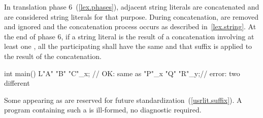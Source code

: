 \exitexample

\pnum
In translation phase 6~(\ref{lex.phases}), adjacent string literals are concatenated and
 are considered string literals for that
purpose. During concatenation,  are removed and ignored and
the concatenation process occurs as described in~\ref{lex.string}. At the end of phase
6, if a string literal is the result of a concatenation involving at least one
, all the participating
 shall have the same 
and that suffix is applied to the result of the concatenation.

\pnum
\enterexample
\begin{codeblock}
int main() {
  L"A" "B" "C"_x; // OK: same as 
  "P"_x "Q" "R"_y;// error: two different 
}
\end{codeblock}
\exitexample%

\pnum
Some  appearing as  are
reserved for future standardization~(\ref{usrlit.suffix}). A program containing
such a  is ill-formed, no diagnostic required.
%
